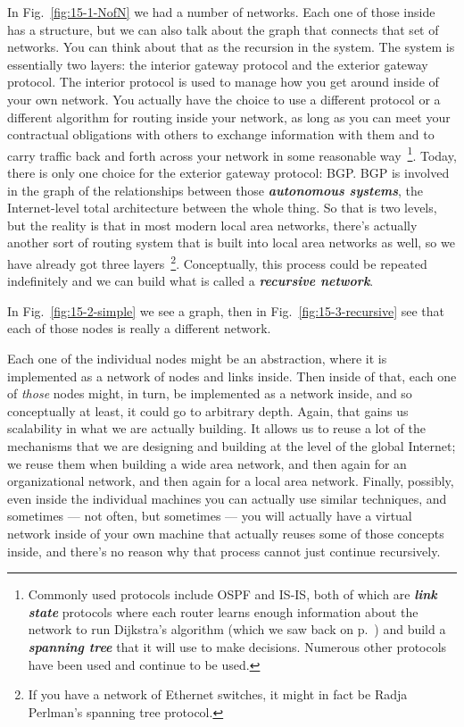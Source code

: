 \rrr In Fig.~\ref{fig:15-1-NofN} we had a number of networks. Each one of those inside has a structure, but we can also talk about the graph that connects that set of networks. You can think about that as the recursion in the system. The system is essentially two layers: the interior gateway protocol and the exterior gateway protocol. The interior protocol is used to manage how you get around inside of your own network. You actually have the choice to use a different protocol or a different algorithm for routing inside your network, as long as you can meet your contractual obligations with others to exchange information with them and to carry traffic back and forth across your network in some reasonable way~\footnote{Commonly used protocols include OSPF and IS-IS, both of which are \textbf{\emph{link state}} protocols where each router learns enough information about the network to run Dijkstra's algorithm (which we saw back on p.~\pageref{dijkstra}) and build a \textbf{\emph{spanning tree}} that it will use to make decisions. Numerous other protocols have been used and continue to be used.}. Today, there is only one choice for the exterior gateway protocol: BGP. BGP is involved in the graph of the relationships between those \textbf{\emph{autonomous systems}}, the Internet-level total architecture between the whole thing. So that is two levels, but the reality is that in most modern local area networks, there's actually another sort of routing system that is built into local area networks as well, so we have already got three layers~\footnote{If you have a network of Ethernet switches, it might in fact be Radja Perlman's spanning tree protocol.}. Conceptually, this process could be repeated indefinitely and we can build what is called a \textbf{\emph{recursive network}}.

\mmm In Fig.~\ref{fig:15-2-simple} we see a graph, then in Fig.~\ref{fig:15-3-recursive} see that each of those nodes is really a different network.

\rrr Each one of the individual nodes might be an abstraction, where it is implemented as a network of nodes and links inside. Then inside of that, each one of \emph{those} nodes might, in turn, be implemented as a network inside, and so conceptually at least, it could go to arbitrary depth. Again, that gains us scalability in what we are actually building. It allows us to reuse a lot of the mechanisms that we are designing and building at the level of the global Internet; we reuse them when building a wide area network, and then again for an organizational network, and then again for a local area network. Finally, possibly, even inside the individual machines you can actually use similar techniques, and sometimes --- not often, but sometimes --- you will actually have a virtual network inside of your own machine that actually reuses some of those concepts inside, and there's no reason why that process cannot just continue recursively.


